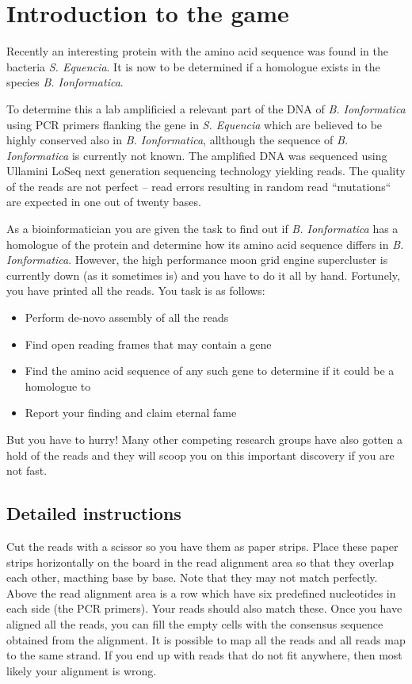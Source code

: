 \section*{Introduction to the game}

Recently an interesting protein with the amino acid sequence \mutantprotein{ }was found in the bacteria \emph{S. Equencia}. 
It is now to be determined if a homologue exists in the species \emph{B. Ionformatica}.

To determine this a lab amplificied a relevant part of the DNA of \emph{B. Ionformatica} using PCR primers flanking
the gene in \emph{S. Equencia} which are believed to be highly conserved also in \emph{B. Ionformatica}, allthough
the sequence of \emph{B. Ionformatica} is currently not known.
The amplified DNA was sequenced using Ullamini LoSeq next generation sequencing technology yielding \numberofreads{ } reads.
The quality of the reads are not perfect -- read errors resulting in random read ``mutations`` are expected in one out of twenty bases. 

As a bioinformatician you are given the task to find out if \emph{B. Ionformatica} has a homologue of the protein \mutantprotein{ } and 
determine how its amino acid sequence differs in \emph{B. Ionformatica}.
However, the high performance moon grid engine supercluster is currently down (as it sometimes is) and you have to do it all by hand. 
Fortunely, you have printed all the reads. 
You task is as follows:

\begin{itemize} 
\item Perform de-novo assembly of all the reads
\item Find open reading frames that may contain a gene
\item Find the amino acid sequence of any such gene to determine if it could be a homologue to \mutantprotein{ }
\item Report your finding and claim eternal fame 
\end{itemize}

But you have to hurry! Many other competing research groups have also gotten a hold of the reads and 
they will scoop you on this important discovery if you are not fast. 

\subsection*{Detailed instructions}

Cut the reads with a scissor so you have them as paper strips. Place these paper strips horizontally on the board in the read alignment area
 so that they overlap each other, macthing base by base. Note that they may not match perfectly. Above the read alignment area
is a row which have six predefined nucleotides in each side (the PCR primers). Your reads should also match these.  
Once you have aligned all the reads, you can fill the empty cells with the consensus sequence obtained from the alignment. 
It is possible to map all the reads and all reads map to the same strand. 
If you end up with reads that do not fit anywhere, then most likely your alignment is wrong. 

